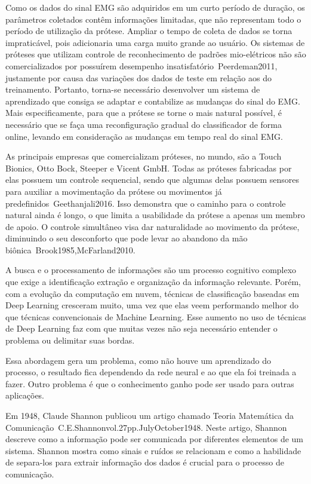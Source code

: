 \documentclass[a4paper, 12pt]{ppgeb}
\begin{document}
Como os dados do sinal EMG são adquiridos em um curto período de duração, os parâmetros coletados contêm informações limitadas, que não representam todo o período de utilização da prótese. Ampliar o tempo de coleta de dados se torna impraticável, pois adicionaria uma carga muito grande ao usuário. Os sistemas de próteses que utilizam controle de reconhecimento de padrões mio-elétricos não são comercializados por possuírem desempenho insatisfatório~\cite{resumoestendido}{Peerdeman2011}, justamente por causa das variações dos dados de teste em relação aos do treinamento. Portanto, torna-se necessário desenvolver um sistema de aprendizado que consiga se adaptar e contabilize as mudanças do sinal do EMG. Mais especificamente, para que a prótese se torne o mais natural possível, é necessário que se faça uma reconfiguração gradual do classificador de forma online, levando em consideração as mudanças em tempo real do sinal EMG.

As principais empresas que comercializam próteses, no mundo, são a Touch Bionics, Otto Bock, Steeper e Vicent GmbH. Todas as próteses fabricadas por elas possuem um controle sequencial, sendo que algumas delas possuem sensores para auxiliar a movimentação da prótese ou movimentos já predefinidos~\cite{resumoestendido}{Geethanjali2016}. Isso demonstra que o caminho para o controle natural ainda é longo, o que limita a usabilidade da prótese a apenas um membro de apoio. O controle simultâneo visa dar naturalidade ao movimento da prótese, diminuindo o seu desconforto que pode levar ao abandono da mão biônica~\cite{resumoestendido}{Brook1985,McFarland2010}.

A busca e o processamento de informações são um processo cognitivo complexo que exige a identificação extração e organização da informação relevante. Porém, com a evolução da computação em nuvem, técnicas de classificação baseadas em Deep Learning cresceram muito, uma vez que elas veem performando melhor do que técnicas convencionais de Machine Learning. Esse aumento no uso de técnicas de Deep Learning faz com que muitas vezes não seja necessário entender o problema ou delimitar suas bordas.

Essa abordagem gera um problema, como não houve um aprendizado do processo, o resultado fica dependendo da rede neural e ao que ela foi treinada a fazer. Outro problema é que o conhecimento ganho pode ser usado para outras aplicações.

Em 1948, Claude Shannon publicou um artigo chamado Teoria Matemática da Comunicação~\cite{resumoestendido}{C.E.Shannonvol.27pp.JulyOctober1948}. Neste artigo, Shannon descreve como a informação pode ser comunicada por diferentes elementos de um sistema. Shannon mostra como sinais e ruídos se relacionam e como a habilidade de separa-los para extrair informação dos dados é crucial para o processo de comunicação.
\end{document}
